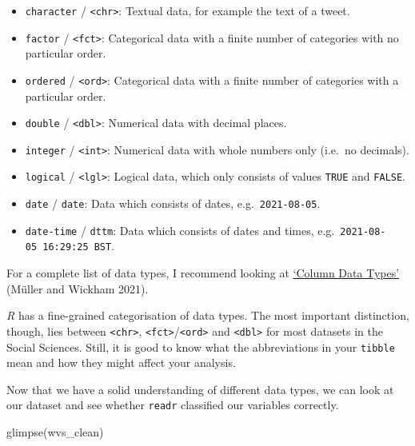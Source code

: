 \documentclass[
  letterpaper,
  DIV=11,
  numbers=noendperiod]{scrreprt}
\newenvironment{Shaded}{\begin{snugshade}}{\end{snugshade}}
\newcommand{\FunctionTok}[1]{\textcolor[rgb]{0.28,0.35,0.67}{#1}}
\newcommand{\NormalTok}[1]{\textcolor[rgb]{0.00,0.23,0.31}{#1}}
\begin{document}
\begin{itemize}
\item
  \texttt{character} / \texttt{\textless{}chr\textgreater{}}: Textual
  data, for example the text of a tweet.
\item
  \texttt{factor} / \texttt{\textless{}fct\textgreater{}}: Categorical
  data with a finite number of categories with no particular order.
\item
  \texttt{ordered} / \texttt{\textless{}ord\textgreater{}}: Categorical
  data with a finite number of categories with a particular order.
\item
  \texttt{double} / \texttt{\textless{}dbl\textgreater{}}: Numerical
  data with decimal places.
\item
  \texttt{integer} / \texttt{\textless{}int\textgreater{}}: Numerical
  data with whole numbers only (i.e.~no decimals).
\item
  \texttt{logical} / \texttt{\textless{}lgl\textgreater{}}: Logical
  data, which only consists of values \texttt{TRUE} and \texttt{FALSE}.
\item
  \texttt{date} / \texttt{date}: Data which consists of dates,
  e.g.~\texttt{2021-08-05}.
\item
  \texttt{date-time} / \texttt{dttm}: Data which consists of dates and
  times, e.g.~\texttt{2021-08-05\ 16:29:25\ BST}.
\end{itemize}

For a complete list of data types, I recommend looking at
\href{https://tibble.tidyverse.org/articles/types.html}{`Column Data
Types'} (Müller and Wickham 2021).

\emph{R} has a fine-grained categorisation of data types. The most
important distinction, though, lies between
\texttt{\textless{}chr\textgreater{}},
\texttt{\textless{}fct\textgreater{}}/\texttt{\textless{}ord\textgreater{}}
and \texttt{\textless{}dbl\textgreater{}} for most datasets in the
Social Sciences. Still, it is good to know what the abbreviations in
your \texttt{tibble} mean and how they might affect your analysis.

Now that we have a solid understanding of different data types, we can
look at our dataset and see whether \texttt{readr} classified our
variables correctly.

\begin{Shaded}
\begin{Highlighting}[]
\FunctionTok{glimpse}\NormalTok{(wvs\_clean)}
\end{Highlighting}
\end{Shaded}
\end{document}
